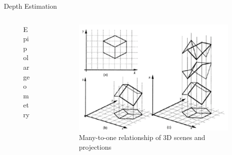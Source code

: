 \documentclass{cubeamer}
\begin{document}
\begin{frame}{Depth Estimation}
\begin{columns}
\begin{column}{0.45\textwidth}
\begin{figure}
                \caption{\tiny Epipolar geometry \cite{epipolar}}
            \end{figure}
        \end{column}
        \begin{column}{0.4\textwidth}
            \begin{figure}
                \centering
                \includegraphics[width=0.85\columnwidth]{figures/ill-posed.PNG}
                \caption{\tiny Many-to-one relationship of 3D scenes and projections \cite{ill-posed}}
            \end{figure}
        \end{column}
    \end{columns}
\end{frame}
\end{document}
